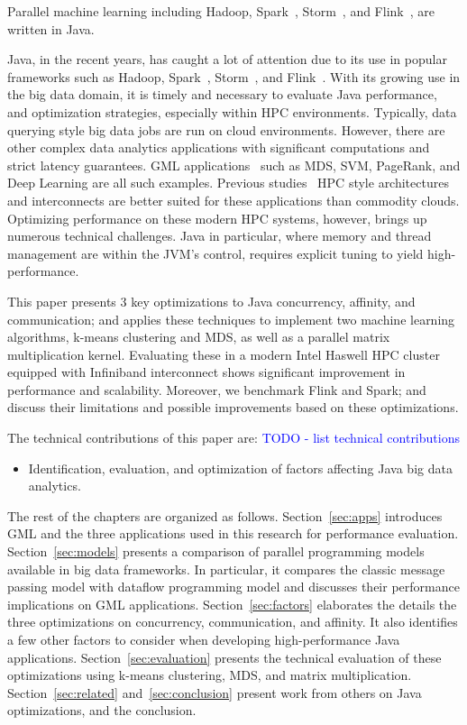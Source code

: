 \documentclass[10pt, conference, compsocconf]{IEEEtran}
\begin{document}
Parallel machine learning 
 including Hadoop, Spark~\cite{Zaharia:2010:SCC:1863103.1863113}, Storm~\cite{toshniwal2014storm}, and Flink~\cite{carbone2015lightweight}, are written in Java.


Java, in the recent years, has caught a lot of attention due to its use in popular frameworks such as Hadoop, Spark~\cite{Zaharia:2010:SCC:1863103.1863113}, Storm~\cite{toshniwal2014storm}, and Flink~\cite{carbone2015lightweight}. With its growing use in the big data domain, it is timely and necessary to evaluate Java performance, and optimization strategies, especially within \ac{HPC} environments. Typically, data querying style big data jobs are run on cloud environments. However, there are other complex data analytics applications with significant computations and strict latency guarantees. \ac{GML} applications~ such as \ac{MDS}, \ac{SVM}, PageRank, and Deep Learning are all such examples. Previous studies~ \ac{HPC} style architectures and interconnects are better suited for these applications than commodity clouds. Optimizing performance on these modern \ac{HPC} systems, however, brings up numerous technical challenges. Java in particular, where memory and thread management are within the \ac{JVM}'s control, requires explicit tuning to yield high-performance. 

This paper presents 3 key optimizations to Java concurrency, affinity, and communication; and applies these techniques to implement two machine learning algorithms, k-means clustering and \ac{MDS}, as well as a parallel matrix multiplication kernel. Evaluating these in a modern Intel Haswell \ac{HPC} cluster equipped with Infiniband interconnect shows significant improvement in performance and scalability. Moreover, we benchmark Flink and Spark; and discuss their limitations and possible improvements based on these optimizations. 

The technical contributions of this paper are:
\textcolor{blue}{TODO - list technical contributions}
\begin{itemize}
\item Identification, evaluation, and optimization of factors affecting Java big data analytics. 
\end{itemize}

The rest of the chapters are organized as follows. Section~\ref{sec:apps} introduces \ac{GML} and the three applications used in this research for performance evaluation. Section~\ref{sec:models} presents a comparison of parallel programming models available in big data frameworks. In particular, it compares the classic  message passing model with dataflow programming model and discusses their performance implications on \ac{GML} applications. Section~\ref{sec:factors} elaborates the details the three optimizations on concurrency, communication, and affinity. It also identifies a few other factors to consider when developing high-performance Java applications. Section~\ref{sec:evaluation} presents the technical evaluation of these optimizations using k-means clustering, \ac{MDS}, and matrix multiplication. Section~\ref{sec:related} and~\ref{sec:conclusion} present work from others on Java optimizations, and the conclusion.
\end{document}
